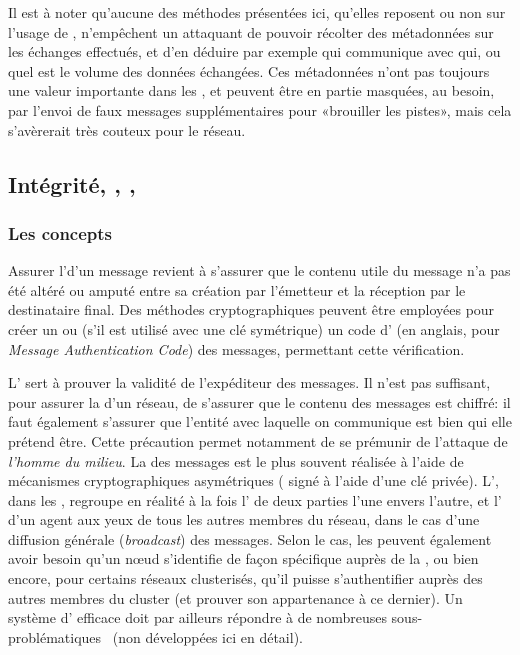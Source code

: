 Il est à noter qu'aucune des méthodes présentées ici, qu'elles reposent ou non sur l'usage de , n'empêchent un attaquant de pouvoir récolter des métadonnées sur les échanges effectués, et d'en déduire par exemple qui communique avec qui, ou quel est le volume des données échangées.
Ces métadonnées n'ont pas toujours une valeur importante dans les \rcs, et peuvent être en partie masquées, au besoin, par l'envoi de faux messages supplémentaires pour «brouiller les pistes», mais cela s'avèrerait très couteux pour le réseau.

\subsection{Intégrité, , , }\label{ea:ssec:auth}

    \subsubsection{Les concepts}
Assurer l'\integrite d'un message revient à s'assurer que le contenu utile du message n'a pas été altéré ou amputé entre sa création par l'émetteur et la réception par le destinataire final.
Des méthodes cryptographiques peuvent être employées pour créer un  ou (s'il est utilisé avec une clé symétrique) un code d' (\macc en anglais, pour \textit{Message Authentication Code}) des messages, permettant cette vérification.

L' sert à prouver la validité de l'expéditeur des messages.
Il n'est pas suffisant, pour assurer la \secu d'un réseau, de s'assurer que le contenu des messages est chiffré: il faut également s'assurer que l'entité avec laquelle on communique est bien qui elle prétend être.
Cette précaution permet notamment de se prémunir de l'attaque de \textit{l'homme du milieu}.
La  des messages est le plus souvent réalisée à l'aide de mécanismes cryptographiques asymétriques ( signé à l'aide d'une clé privée).
L', dans les \rcsfs, regroupe en réalité à la fois l' de deux parties l'une envers l'autre, et l' d'un agent aux yeux de tous les autres membres du réseau, dans le cas d'une diffusion générale (\textit{broadcast}) des messages.
Selon le cas, les \rcs peuvent également avoir besoin qu'un nœud s'identifie de façon spécifique auprès de la \sdb, ou bien encore, pour certains réseaux clusterisés, qu'il puisse s'authentifier auprès des autres membres du cluster (et prouver son appartenance à ce dernier).
Un système d' efficace doit par ailleurs répondre à de nombreuses sous-problématiques~\cite{KKA15} (non développées ici en détail).


